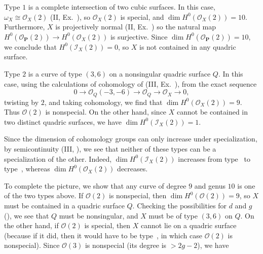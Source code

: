 {\hypertarget{type-IV-6.4.3-1}{}Type $1$ is a complete intersection of two cubic surfaces. In this case, $\omega_X\cong\mathcal O_X(2)$ (II, Ex.~), so $\mathcal O_X(2)$ is special, and $\dim H^0(\mathcal O_X(2))=10$. Furthermore, $X$ is projectively normal (II, Ex.~) so the natural map $H^0(\mathcal O_{\mathbf P}(2))\to H^0(\mathcal O_X(2))$ is surjective. Since $\dim H^0(\mathcal O_{\mathbf P}(2))=10$, we conclude that $H^0(\mathcal I_X(2))=0$, so $X$ is not contained in any quadric surface.

\hypertarget{type-IV-6.4.3-2}{}Type $2$ is a curve of type $(3,6)$ on a nonsingular quadric surface $Q$. In this case, using the calculations of cohomology of (III, Ex.~), from the exact sequence
\[
0\longrightarrow\mathcal O_Q(-3,-6)\longrightarrow\mathcal O_Q\longrightarrow\mathcal O_X\longrightarrow0,
\]
twisting by $2$, and taking cohomology, we find that $\dim H^0(\mathcal O_X(2))=9$. Thus $\mathcal O(2)$ is nonspecial. On the other hand, since $X$ cannot be contained in two distinct quadric surfaces, we have $\dim H^0(\mathcal I_X(2))=1$.

Since the dimension of cohomology groups can only increase under specialization, by semicontinuity (III, ), we see that neither of these types can be a specialization of the other. Indeed, $\dim H^0(\mathcal I_X(2))$ increases from type~ to type~, whereas $\dim H^0(\mathcal O_X(2))$ decreases.

To complete the picture, we show that any curve of degree $9$ and genus $10$ is one of the two types above. If $\mathcal O(2)$ is nonspecial, then $\dim H^0(\mathcal O(2))=9$, so $X$ must be contained in a quadric surface $Q$. Checking the possibilities for $d$ and $g$ (), we see that $Q$ must be nonsingular, and $X$ must be of type $(3,6)$ on $Q$. On the other hand, if $\mathcal O(2)$ is special, then $X$ cannot lie on a quadric surface (because if it did, then it would have to be type~, in which case $\mathcal O(2)$ is nonspecial). Since $\mathcal O(3)$ is nonspecial (its degree is $>2g-2$), we have}
